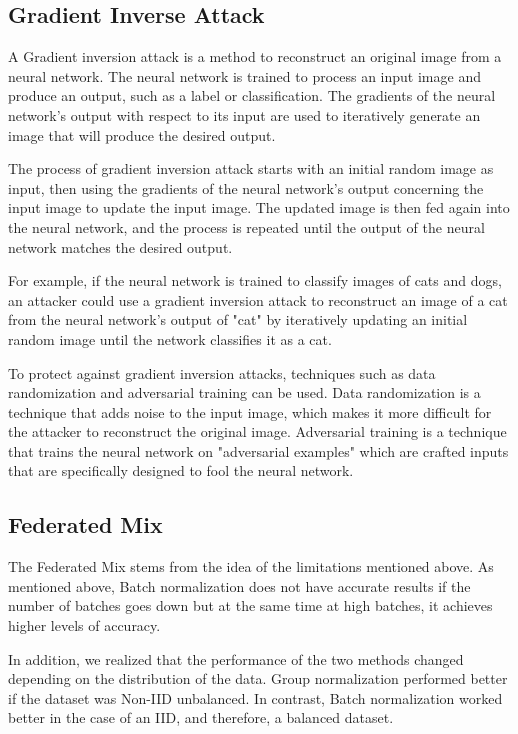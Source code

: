 \documentclass[conference]{IEEEtran}
\begin{document}
\subsection{Gradient Inverse Attack}
A Gradient inversion attack is a method to reconstruct an original image from a neural network. The neural network is trained to process an input image and produce an output, such as a label or classification. The gradients of the neural network's output with respect to its input are used to iteratively generate an image that will produce the desired output.

The process of gradient inversion attack starts with an initial random image as input, then using the gradients of the neural network's output concerning the input image to update the input image. The updated image is then fed again into the neural network, and the process is repeated until the output of the neural network matches the desired output.

For example, if the neural network is trained to classify images of cats and dogs, an attacker could use a gradient inversion attack to reconstruct an image of a cat from the neural network's output of "cat" by iteratively updating an initial random image until the network classifies it as a cat.

To protect against gradient inversion attacks, techniques such as data randomization and adversarial training can be used. Data randomization is a technique that adds noise to the input image, which makes it more difficult for the attacker to reconstruct the original image. Adversarial training is a technique that trains the neural network on "adversarial examples" which are crafted inputs that are specifically designed to fool the neural network.

\subsection{\textbf{Federated Mix}}

The Federated Mix stems from the idea of the limitations mentioned above. As mentioned above, Batch normalization does not have accurate results if the number of batches goes down but at the same time at high batches, it achieves higher levels of accuracy. 

In addition, we realized that the performance of the two methods changed depending on the distribution of the data. Group normalization performed better if the dataset was Non-IID unbalanced. In contrast, Batch normalization worked better in the case of an IID, and therefore, a balanced dataset.
\end{document}
